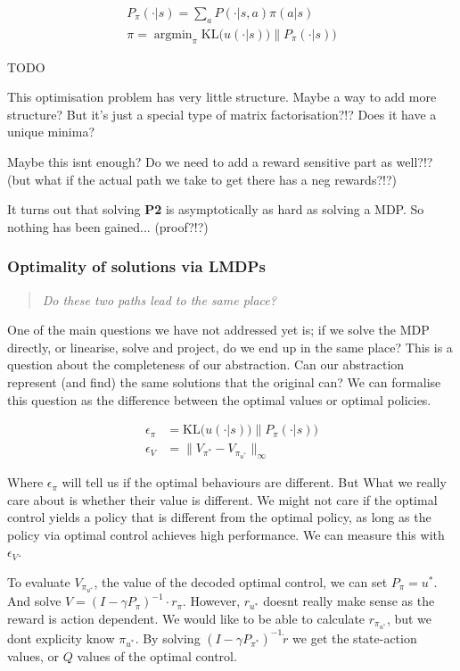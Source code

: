 \begin{align}
P_{\pi}(\cdot | s) = \sum_a P(\cdot | s, a) \pi(a | s) \\
\pi = \mathop{\text{argmin}}_{\pi} \text{KL}\Big(u(\cdot | s))\parallel P_{\pi}(\cdot | s)\Big)
\end{align}

{\color{red}TODO}

This optimisation problem has very little structure.
Maybe a way to add more structure?
But it's just a special type of matrix factorisation?!? Does it have a unique minima?

Maybe this isnt enough? Do we need to add a reward sensitive part as
well?!? (but what if the actual path we take to get there has a neg
rewards?!?)

It turns out that solving \textbf{P2} is asymptotically as hard as solving a MDP.
So nothing has been gained... (proof?!?)

\subsubsection{Optimality of solutions via LMDPs}

\begin{quote}
\textit{Do these two paths lead to the same place?}
\end{quote}

One of the main questions we have not addressed yet is; if we solve the
MDP directly, or linearise, solve and project, do we end up in the same
place? This is a question about the completeness of our abstraction. Can
our abstraction represent (and find) the same solutions that the
original can? We can formalise this question as the difference between the optimal values or optimal policies.

\begin{align*}
\epsilon_{\pi} &= \text{KL}\Big(u(\cdot | s))\parallel P_{\pi}(\cdot | s)\Big) \\
\epsilon_{V} &= \parallel V_{\pi^{* }} - V_{\pi_{u^{* }}} \parallel_{\infty}
\end{align*}

Where $\epsilon_{\pi}$ will tell us if the optimal behaviours are different. But What we really care about
is whether their value is different. We might not care if the optimal control
yields a policy that is different from the optimal policy, as long as the
policy via optimal control achieves high performance. We can measure this with $\epsilon_{V}$.

To evaluate $V_{\pi_{u^{* }}}$, the value of the decoded optimal control, we can
set $P_{\pi} = u^{* }$. And solve $V = (I - \gamma P_{\pi})^{-1} \cdot r_{\pi}$.
However, $r_{u^{* }}$ doesnt really make sense as the reward is action
dependent. We would like to be able to calculate $r_{\pi_{u^{* } }}$, but we dont
explicity know \(\pi_{u^{* }}\). By solving $(I - \gamma P_{\pi^{* }})^{-1} \dot r$
we get the state-action values, or $Q$ values of the optimal control.

